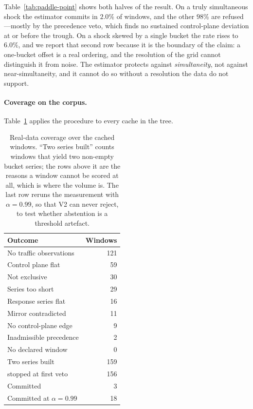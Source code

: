 Table~\ref{tab:paddle-point} shows both halves of the result. On a truly
simultaneous shock the estimator commits in $2.0\%$ of windows, and the
other $98\%$ are refused---mostly by the precedence veto, which finds no
sustained control-plane deviation at or before the trough. On a shock
skewed by a single bucket the rate rises to $6.0\%$, and we report that
second row because it is the boundary of the claim: a one-bucket offset
is a real ordering, and the resolution of the grid cannot distinguish it
from noise. The estimator protects against \emph{simultaneity}, not
against near-simultaneity, and it cannot do so without a resolution the data
do not support.

\paragraph{Coverage on the corpus.} Table~\ref{tab:paddle-coverage} applies the
procedure to every cache in the tree.

\begin{table}[t]
\centering
\caption{Real-data coverage over the cached windows. ``Two series
built'' counts windows that yield two non-empty bucket series; the rows
above it are the reasons a window cannot be scored at all, which is where
the volume is. The last row reruns the measurement with $\alpha=0.99$, so
that V2 can never reject, to test whether abstention is a threshold
artefact.}
\label{tab:paddle-coverage}
\footnotesize
\begin{tabular}{l r}
\hline
\textbf{Outcome} & \textbf{Windows} \\
\hline
No traffic observations       & 121 \\
Control plane flat            &  59 \\
Not exclusive                 &  30 \\
Series too short              &  29 \\
Response series flat          &  16 \\
Mirror contradicted           &  11 \\
No control-plane edge         &   9 \\
Inadmissible precedence       &   2 \\
No declared window            &   0 \\
\addlinespace
Two series built             & 159 \\
\quad stopped at first veto & 156 \\
\addlinespace
Committed                     &   3 \\
Committed at $\alpha=0.99$   &  18 \\
\hline
\end{tabular}
\end{table}

